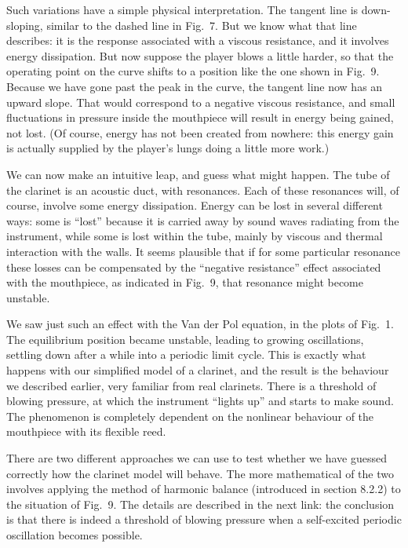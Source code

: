   Such variations have a simple physical interpretation. The tangent line is 
  down-sloping, similar to the dashed line in Fig.\ 7. But we know what that 
  line describes: it is the response associated with a viscous resistance, and 
  it involves energy dissipation. But now suppose the player blows a little 
  harder, so that the operating point on the curve shifts to a position like 
  the one shown in Fig.\ 9. Because we have gone past the peak in the curve, 
  the tangent line now has an upward slope. That would correspond to a negative 
  viscous resistance, and small fluctuations in pressure inside the mouthpiece 
  will result in energy being gained, not lost. (Of course, energy has not been 
  created from nowhere: this energy gain is actually supplied by the player’s 
  lungs doing a little more work.) 

  We can now make an intuitive leap, and guess what might happen. The tube of 
  the clarinet is an acoustic duct, with resonances. Each of these resonances 
  will, of course, involve some energy dissipation. Energy can be lost in 
  several different ways: some is “lost” because it is carried away by sound 
  waves radiating from the instrument, while some is lost within the tube, 
  mainly by viscous and thermal interaction with the walls. It seems plausible 
  that if for some particular resonance these losses can be compensated by the 
  “negative resistance” effect associated with the mouthpiece, as indicated in 
  Fig.\ 9, that resonance might become unstable. 

  We saw just such an effect with the Van der Pol equation, in the plots of 
  Fig.\ 1. The equilibrium position became unstable, leading to growing 
  oscillations, settling down after a while into a periodic limit cycle. This 
  is exactly what happens with our simplified model of a clarinet, and the 
  result is the behaviour we described earlier, very familiar from real 
  clarinets. There is a threshold of blowing pressure, at which the instrument 
  “lights up” and starts to make sound. The phenomenon is completely dependent 
  on the nonlinear behaviour of the mouthpiece with its flexible reed. 

  There are two different approaches we can use to test whether we have guessed 
  correctly how the clarinet model will behave. The more mathematical of the 
  two involves applying the method of harmonic balance (introduced in section 
  8.2.2) to the situation of Fig.\ 9. The details are described in the next 
  link: the conclusion is that there is indeed a threshold of blowing pressure 
  when a self-excited periodic oscillation becomes possible. 

